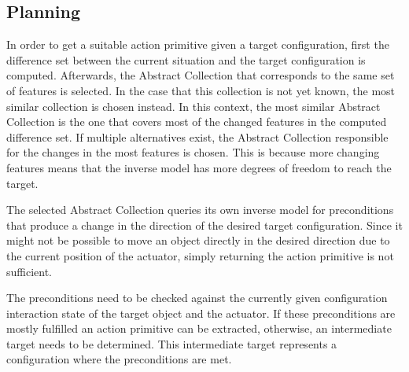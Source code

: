 \subsection{Planning \label{sec:pairPlanning}}


In order to get a suitable action primitive given a target configuration, first the 
difference set between the current situation and the target configuration is computed. Afterwards, the Abstract Collection that corresponds to the same set of features is selected. In the case that this collection is not yet known, the most similar collection is chosen instead. In this context, the most similar Abstract Collection is the one that covers most of the changed features in the computed difference set. If multiple alternatives exist, the Abstract Collection responsible for the changes in the most features is chosen. This is because more changing features means that the inverse model has more degrees of freedom to reach the target.

The selected Abstract Collection queries its own inverse model for preconditions that produce a change in the direction of the desired target configuration. 
Since it might not be possible to move an object directly in the desired direction due to the current position of the actuator, simply returning the action primitive is not sufficient.

The preconditions need to be checked against the currently given configuration interaction state of the target object and the actuator. If these preconditions are mostly fulfilled an action primitive can be extracted, otherwise, an intermediate target needs to be determined. This intermediate target represents a configuration where the preconditions are met.


